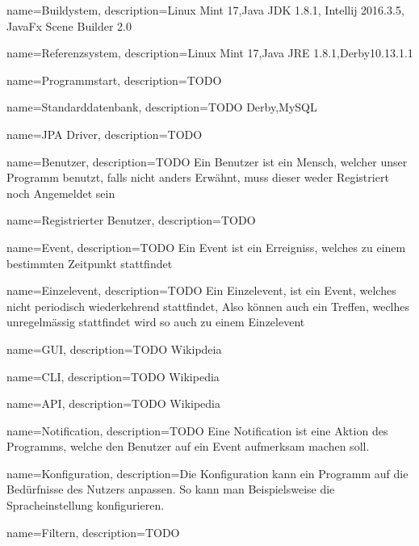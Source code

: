 
{
  name=Buildystem,
  description={Linux Mint 17,Java JDK 1.8.1, Intellij 2016.3.5, JavaFx Scene Builder 2.0}
} 

{
  name=Referenzsystem,
  description={Linux Mint 17,Java JRE 1.8.1,Derby10.13.1.1}
} 

{
  name=Programmstart,
  description={TODO}
} 

 
{
  name=Standarddatenbank,
  description={TODO Derby,MySQL }
} 


{
  name=JPA Driver,
  description={TODO}
} 

{
  name=Benutzer,
  description={TODO Ein Benutzer ist ein Mensch, welcher unser Programm benutzt, falls nicht anders Erwähnt, muss dieser weder Registriert noch Angemeldet sein}
} 



{
  name=Registrierter Benutzer,
  description={TODO}
} 

{
  name=Event,
  description={TODO Ein Event ist ein Erreigniss, welches zu einem bestimmten Zeitpunkt stattfindet}
} 

{
  name=Einzelevent,
  description={TODO Ein Einzelevent, ist ein Event, welches nicht periodisch wiederkehrend stattfindet, Also können auch ein Treffen, weclhes unregelmässig stattfindet wird so auch zu einem Einzelevent}
} 

{
  name=GUI,
  description={TODO Wikipdeia}
} 

{
  name=CLI,
  description={TODO Wikipedia}
} 

{
  name=API,
  description={TODO Wikipedia}
} 

{
  name=Notification,
  description={TODO Eine Notification ist eine Aktion des Programms, welche den Benutzer auf ein Event aufmerksam machen soll.}
} 

{
  name=Konfiguration,
  description={Die Konfiguration kann ein Programm auf die Bedürfnisse des Nutzers anpassen. So kann man Beispielsweise die Spracheinstellung konfigurieren.}
} 



{
  name=Filtern,
  description={TODO}
} 

